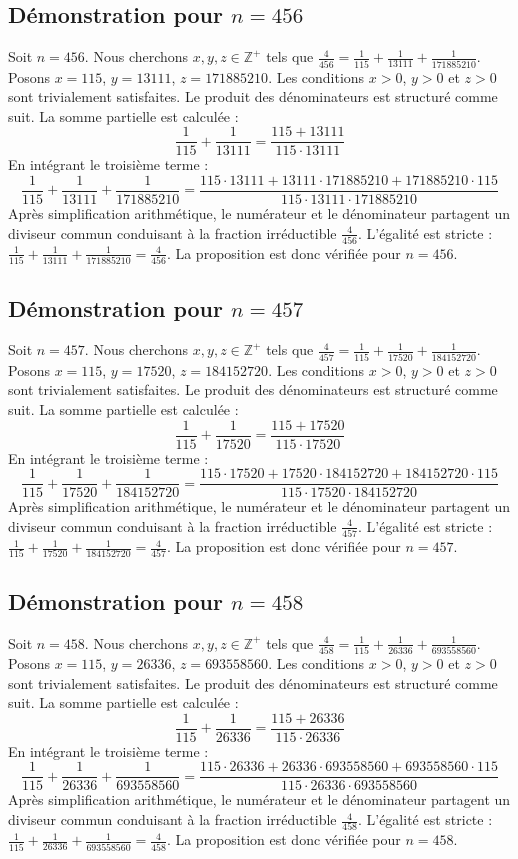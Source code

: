 \documentclass[11pt,a4paper]{article}
\begin{document}
\subsection{Démonstration pour $n = 456$}
Soit $n = 456$. Nous cherchons $x, y, z \in \mathbb{Z}^{+}$ tels que $\frac{4}{456} = \frac{1}{115} + \frac{1}{13111} + \frac{1}{171885210}$.
Posons $x = 115$, $y = 13111$, $z = 171885210$.
Les conditions $x > 0$, $y > 0$ et $z > 0$ sont trivialement satisfaites.
Le produit des dénominateurs est structuré comme suit. La somme partielle est calculée :
$$ \frac{1}{115} + \frac{1}{13111} = \frac{115+13111}{115 \cdot 13111} $$
En intégrant le troisième terme :
$$ \frac{1}{115} + \frac{1}{13111} + \frac{1}{171885210} = \frac{115 \cdot 13111 + 13111 \cdot 171885210 + 171885210 \cdot 115}{115 \cdot 13111 \cdot 171885210} $$
Après simplification arithmétique, le numérateur et le dénominateur partagent un diviseur commun conduisant à la fraction irréductible $\frac{4}{456}$.
L'égalité est stricte : $\frac{1}{115} + \frac{1}{13111} + \frac{1}{171885210} = \frac{4}{456}$.
La proposition est donc vérifiée pour $n = 456$.
\subsection{Démonstration pour $n = 457$}
Soit $n = 457$. Nous cherchons $x, y, z \in \mathbb{Z}^{+}$ tels que $\frac{4}{457} = \frac{1}{115} + \frac{1}{17520} + \frac{1}{184152720}$.
Posons $x = 115$, $y = 17520$, $z = 184152720$.
Les conditions $x > 0$, $y > 0$ et $z > 0$ sont trivialement satisfaites.
Le produit des dénominateurs est structuré comme suit. La somme partielle est calculée :
$$ \frac{1}{115} + \frac{1}{17520} = \frac{115+17520}{115 \cdot 17520} $$
En intégrant le troisième terme :
$$ \frac{1}{115} + \frac{1}{17520} + \frac{1}{184152720} = \frac{115 \cdot 17520 + 17520 \cdot 184152720 + 184152720 \cdot 115}{115 \cdot 17520 \cdot 184152720} $$
Après simplification arithmétique, le numérateur et le dénominateur partagent un diviseur commun conduisant à la fraction irréductible $\frac{4}{457}$.
L'égalité est stricte : $\frac{1}{115} + \frac{1}{17520} + \frac{1}{184152720} = \frac{4}{457}$.
La proposition est donc vérifiée pour $n = 457$.
\subsection{Démonstration pour $n = 458$}
Soit $n = 458$. Nous cherchons $x, y, z \in \mathbb{Z}^{+}$ tels que $\frac{4}{458} = \frac{1}{115} + \frac{1}{26336} + \frac{1}{693558560}$.
Posons $x = 115$, $y = 26336$, $z = 693558560$.
Les conditions $x > 0$, $y > 0$ et $z > 0$ sont trivialement satisfaites.
Le produit des dénominateurs est structuré comme suit. La somme partielle est calculée :
$$ \frac{1}{115} + \frac{1}{26336} = \frac{115+26336}{115 \cdot 26336} $$
En intégrant le troisième terme :
$$ \frac{1}{115} + \frac{1}{26336} + \frac{1}{693558560} = \frac{115 \cdot 26336 + 26336 \cdot 693558560 + 693558560 \cdot 115}{115 \cdot 26336 \cdot 693558560} $$
Après simplification arithmétique, le numérateur et le dénominateur partagent un diviseur commun conduisant à la fraction irréductible $\frac{4}{458}$.
L'égalité est stricte : $\frac{1}{115} + \frac{1}{26336} + \frac{1}{693558560} = \frac{4}{458}$.
La proposition est donc vérifiée pour $n = 458$.
\end{document}
